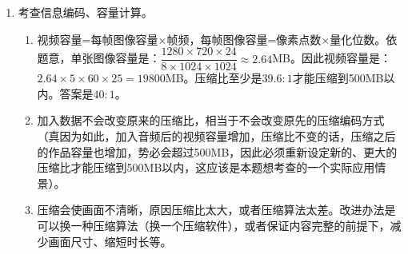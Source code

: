 \begin{enumerate}
\item 考查信息编码、容量计算。
	\begin{enumerate}[label=$(\arabic*)$]
	\item {\kaishu 视频容量=每帧图像容量$\times$帧频，每帧图像容量=像素点数$\times$量化位数}。依题意，单张图像容量是：$\dfrac{1280 \times 720 \times 24}{8 \times 1024 \times 1024} \approx 2.64$MB。因此视频容量是：$2.64 \times 5 \times 60 \times 25 = 19800$MB。压缩比至少是$39.6:1$才能压缩到500MB以内。答案是$40:1$。
	\item 加入数据不会改变原来的压缩比，相当于不会改变原先的压缩编码方式（真因为如此，加入音频后的视频容量增加，压缩比不变的话，压缩之后的作品容量也增加，势必会超过500MB，因此必须重新设定新的、更大的压缩比才能压缩到500MB以内，这应该是本题想考查的一个实际应用情景）。
	\item 压缩会使画面不清晰，原因压缩比太大，或者压缩算法太差。改进办法是可以换一种压缩算法（换一个压缩软件），或者保证内容完整的前提下，减少画面尺寸、缩短时长等。
	\end{enumerate}

\end{enumerate}


\newpage
